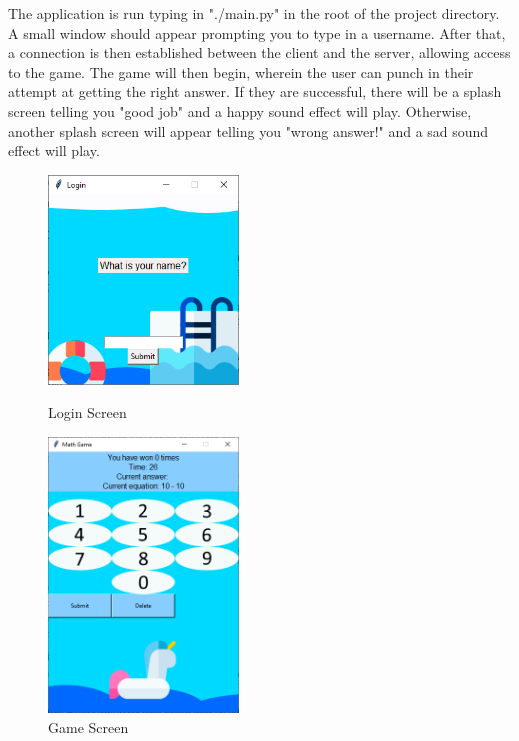 \documentclass[12pt]{article}
\begin{document}
The application is run typing in "./main.py" in the root of the project directory.
A small window should appear prompting you to type in a username.
After that, a connection is then established between the client and the server, allowing access to the game.
The game will then begin, wherein the user can punch in their attempt at getting the right answer.
If they are successful, there will be a splash screen telling you "good job" and a happy sound effect will play.
Otherwise, another splash screen will appear telling you "wrong answer!" and a sad sound effect will play.

\begin{figure}[hp]
    \centering

    \includegraphics[width=0.45\textwidth]{Login.PNG}
    \caption{Login Screen}

    \vspace*{\floatsep}

    \includegraphics[width=0.45\textwidth]{In-Game.PNG}
    \caption{Game Screen}
\end{figure}
\end{document}
